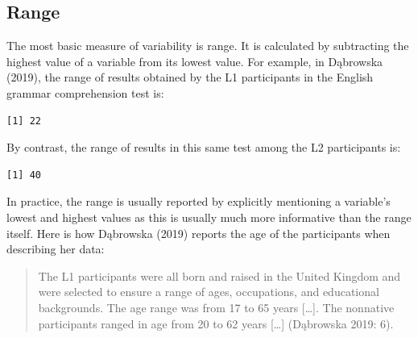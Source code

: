 \documentclass[
  letterpaper,
  DIV=11,
  numbers=noendperiod]{scrreprt}
\newenvironment{Shaded}{\begin{snugshade}}{\end{snugshade}}
\newcommand{\FunctionTok}[1]{\textcolor[rgb]{0.28,0.35,0.67}{#1}}
\newcommand{\NormalTok}[1]{\textcolor[rgb]{0.00,0.23,0.31}{#1}}
\newcommand{\SpecialCharTok}[1]{\textcolor[rgb]{0.37,0.37,0.37}{#1}}
\begin{document}
\subsection{Range}\label{sec-Range}

The most basic measure of variability is range. It is calculated by
subtracting the highest value of a variable from its lowest value. For
example, in Dąbrowska (2019), the range of results obtained by the L1
participants in the English grammar comprehension test is:

\begin{Shaded}
\end{Shaded}

\begin{verbatim}
[1] 22
\end{verbatim}

By contrast, the range of results in this same test among the L2
participants is:

\begin{Shaded}
\end{Shaded}

\begin{verbatim}
[1] 40
\end{verbatim}

In practice, the range is usually reported by explicitly mentioning a
variable's lowest and highest values as this is usually much more
informative than the range itself. Here is how Dąbrowska (2019) reports
the age of the participants when describing her data:

\begin{quote}
The L1 participants were all born and raised in the United Kingdom and
were selected to ensure a range of ages, occupations, and educational
backgrounds. The age range was from 17 to 65 years {[}\ldots{]}. The
nonnative participants ranged in age from 20 to 62 years {[}\ldots{]}
(Dąbrowska 2019: 6).
\end{quote}
\end{document}
